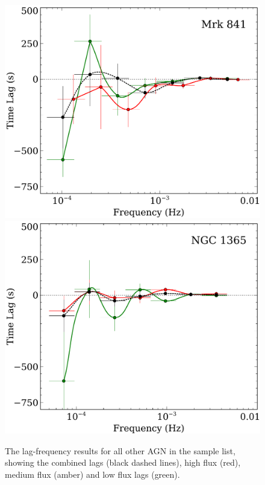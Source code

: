 \documentclass{article}
\begin{document}
\begin{figure}
\includegraphics[scale=0.4]{images/Mrk841-lag-results-lo-hi-flux-FP.pdf}
\includegraphics[scale=0.4]{images/NGC1365-lag-results-lo-hi-flux-FP.pdf}
\caption[The lag-frequency results]{The lag-frequency results for all other AGN in the sample list, showing the combined lags (black dashed lines), high flux (red), medium flux (amber) and low flux lags (green).  }
\label{fig:lagfreq-results}
\end{figure}
\end{document}
